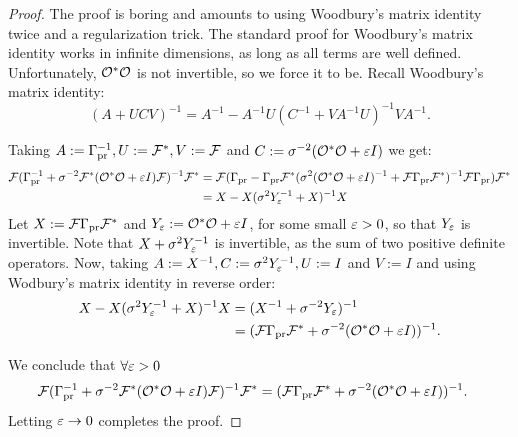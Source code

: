 \documentclass{amsart}
\numberwithin{equation}{section}
\begin{document}
\woodbury
\begin{proof}
  The proof is boring and amounts to using Woodbury's matrix identity
  twice and a regularization trick. The standard proof for Woodbury's
  matrix identity works in infinite dimensions, as long as all terms
  are well defined. Unfortunately, $\mathcal{O}^*\mathcal{O}$ is not invertible, so
  we force it to be. Recall Woodbury's matrix identity:
  $$
  (A + UCV)^{-1} = A^{-1} - A^{-1}U(C^{-1} + VA^{-1}U)^{-1}VA^{-1}.
  $$

  Taking $A := \Gamma_{\textup{pr}}^{-1}, U := \mathcal{F}^*, V := \mathcal{F}$ and $C :=
  \sigma^{-2} (\mathcal{O}^*\mathcal{O}+\varepsilon I)$ we get:
  \begin{align*}
    \begin{split}
      \mathcal{F}( \Gamma_{\textup{pr}}^{-1} + \sigma^{-2}  \mathcal{F}^* (\mathcal{O}^* \mathcal{O} +\varepsilon I) \mathcal{F} )^{-1}\mathcal{F}^* &=
      \mathcal{F} ( \Gamma_{\textup{pr}} - \Gamma_{\textup{pr}} \mathcal{F}^* ( \sigma^2(\mathcal{O}^*\mathcal{O} + \varepsilon I)^{-1} + \mathcal{F} \Gamma_{\textup{pr}} \mathcal{F}^* )^{-1} \mathcal{F} \Gamma_{\textup{pr}} ) \mathcal{F}^* \\
      &= X - X(\sigma^2Y_{\varepsilon}^{-1} + X)^{-1}X
    \end{split}
  \end{align*}
  Let $X := \mathcal{F}\Gamma_{\textup{pr}} \mathcal{F}^*$ and $Y_{\varepsilon} := \mathcal{O}^*\mathcal{O} + \varepsilon I$,
  for some small $\varepsilon > 0$, so that $Y_{\varepsilon}$ is invertible.  Note
  that $X + \sigma^2 Y_{\varepsilon}^{-1}$ is invertible, as the sum of two
  positive definite operators. Now, taking $A := X^{-1}, C :=
  \sigma^2Y_{\varepsilon}^{-1}, U := I$ and $V := I$ and using Wodbury's
  matrix identity in reverse order:
  \begin{align*}
    \begin{split}
      X - X(\sigma^2Y_{\varepsilon}^{-1} + X)^{-1}X &= (X^{-1} + \sigma^{-2}Y_{\varepsilon})^{-1} \\
      &= (\mathcal{F} \Gamma_{\textup{pr}} \mathcal{F}^* + \sigma^{-2} (\mathcal{O}^*\mathcal{O} + \varepsilon I))^{-1}.
    \end{split}
  \end{align*}

  We conclude that $\forall \varepsilon > 0$
  \begin{align*}
    \begin{split}
      \mathcal{F}( \Gamma_{\textup{pr}}^{-1} + \sigma^{-2}  \mathcal{F}^* (\mathcal{O}^* \mathcal{O} +\varepsilon I) \mathcal{F} )^{-1}\mathcal{F}^* 
     &= (\mathcal{F} \Gamma_{\textup{pr}} \mathcal{F}^* + \sigma^{-2} (\mathcal{O}^*\mathcal{O} + \varepsilon I))^{-1}.
    \end{split}
  \end{align*}
  Letting $\varepsilon \to 0$ completes the proof.
\end{proof}
\end{document}

